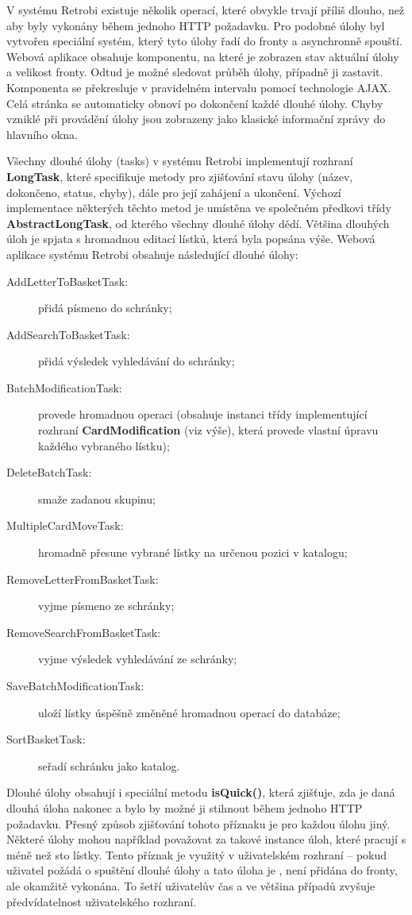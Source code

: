 V systému Retrobi existuje několik operací, které obvykle trvají příliš dlouho, než aby byly vykonány během jednoho HTTP požadavku. Pro podobné úlohy byl vytvořen speciální systém, který tyto úlohy řadí do fronty a asynchronně spouští. Webová aplikace obsahuje komponentu, na které je zobrazen stav aktuální úlohy a velikost fronty. Odtud je možné sledovat průběh úlohy, případně ji zastavit. Komponenta se překresluje v pravidelném intervalu pomocí technologie AJAX. Celá stránka se automaticky obnoví po dokončení každé dlouhé úlohy. Chyby vzniklé při provádění úlohy jsou zobrazeny jako klasické informační zprávy do hlavního okna. 

Všechny dlouhé úlohy (tasks) v systému Retrobi implementují rozhraní {\bf LongTask}, které specifikuje metody pro zjišťování stavu úlohy (název, dokončeno, status, chyby), dále pro její zahájení a ukončení. Výchozí implementace některých těchto metod je umístěna ve společném předkovi třídy {\bf AbstractLongTask}, od kterého všechny dlouhé úlohy dědí. Většina dlouhých úloh je spjata s hromadnou editací lístků, která byla popsána výše. Webová aplikace systému Retrobi obsahuje následující dlouhé úlohy:

\begin{description}
\item[AddLetterToBasketTask:]{přidá písmeno do schránky;}
\item[AddSearchToBasketTask:]{přidá výsledek vyhledávání do schránky;}
\item[BatchModificationTask:]{provede hromadnou operaci (obsahuje instanci třídy implementující rozhraní {\bf CardModification} (viz výše), která provede vlastní úpravu každého vybraného lístku);}
\item[DeleteBatchTask:]{smaže zadanou skupinu;}
\item[MultipleCardMoveTask:]{hromadně přesune vybrané lístky na určenou pozici v katalogu;}
\item[RemoveLetterFromBasketTask:]{vyjme písmeno ze schránky;}
\item[RemoveSearchFromBasketTask:]{vyjme výsledek vyhledávání ze schránky;}
\item[SaveBatchModificationTask:]{uloží lístky úspěšně změněné hromadnou operací do databáze;}
\item[SortBasketTask:]{seřadí schránku jako katalog.}
\end{description}

Dlouhé úlohy obsahují i speciální metodu {\bf isQuick()}, která zjišťuje, zda je daná dlouhá úloha nakonec  a bylo by možné ji stihnout během jednoho HTTP požadavku. Přesný způsob zjišťování tohoto příznaku je pro každou úlohu jiný. Některé úlohy mohou například považovat za  takové instance úloh, které pracují s méně než sto lístky. Tento příznak je využitý v uživatelském rozhraní -- pokud uživatel požádá o spuštění dlouhé úlohy a tato úloha je , není přidána do fronty, ale okamžitě vykonána. To šetří uživatelův čas a ve většina případů zvyšuje předvídatelnost uživatelského rozhraní.

